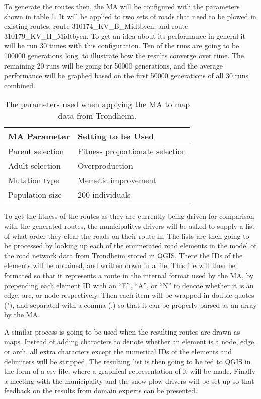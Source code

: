 To generate the routes then, the MA will be configured with the parameters shown in table \ref{tab:trondheim_params_table}. It will be applied to two sets of roads that need to be plowed in existing routes; route 310174\_KV\_B\_Midtbyen, and route 310179\_KV\_H\_Midtbyen. To get an idea about its performance in general it will be run 30 times with this configuration. Ten of the runs are going to be 100000 generations long, to illustrate how the results converge over time. The remaining 20 runs will be going for 50000 generations, and the average performance will be graphed based on the first 50000 generations of all 30 runs combined.

{
\begin{table}[tbph]
\centering
\begin{tabular}{ll}
\toprule
\textbf{MA Parameter} & \textbf{Setting to be Used}     \\ \midrule
Parent selection      & Fitness proportionate selection \\
Adult selection       & Overproduction                  \\
Mutation type         & Memetic improvement             \\
Population size       & 200 individuals                 \\ \bottomrule
\end{tabular}
\caption{The parameters used when applying the MA to map data from Trondheim.}
\label{tab:trondheim_params_table}
\end{table}
}

To get the fitness of the routes as they are currently being driven for comparison with the generated routes, the municipalitys drivers will be asked to supply a list of what order they clear the roads on their route in. The lists are then going to be processed by looking up each of the enumerated road elements in the model of the road network data from Trondheim stored in QGIS. There the IDs of the elements will be obtained, and written down in a file. This file will then be formated so that it represents a route in the internal format used by the MA, by prepending each element ID with an \enquote{E}, \enquote{A}, or \enquote{N} to denote whether it is an edge, arc, or node respectively. Then each item will be wrapped in double quotes ("), and separated with a comma (,) so that it can be properly parsed as an array by the MA.

A similar process is going to be used when the resulting routes are drawn as maps. Instead of adding characters to denote whether an element is a node, edge, or arch, all extra characters except the numerical IDs of the elements and delimiters will be stripped. The resulting list is then going to be fed to QGIS in the form of a csv-file, where a graphical representation of it will be made. Finally a meeting with the municipality and the snow plow drivers will be set up so that feedback on the results from domain experts can be presented.


